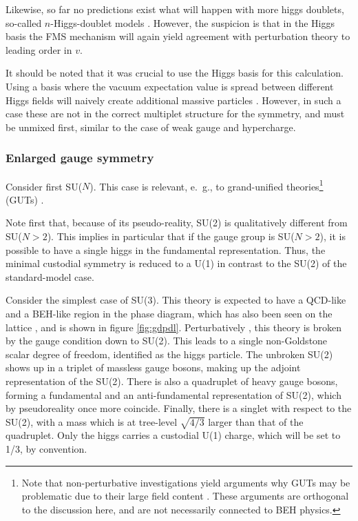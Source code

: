 \documentclass[final,twoside,12pt]{article}
\newcommand*{\1}{1\!\!\!\bot}
\begin{document}
Likewise, so far no predictions exist what will happen with more higgs doublets, so-called $n$-Higgs-doublet models \cite{Ivanov:2017dad}. However, the suspicion is that in the Higgs basis the FMS mechanism will again yield agreement with perturbation theory to leading order in $v$.

It should be noted that it was crucial to use the Higgs basis for this calculation. Using a basis where the vacuum expectation value is spread between different Higgs fields will naively create additional massive particles \cite{Maas:2015gma}. However, in such a case these are not in the correct multiplet structure for the symmetry, and must be unmixed first, similar to the case of weak gauge and hypercharge.

\subsubsection{Enlarged gauge symmetry}\label{sss:gut}

Consider first SU($N$). This case is relevant, e.\ g., to grand-unified theories\footnote{Note that non-perturbative investigations yield arguments why GUTs may be problematic due to their large field content \cite{Llanes-Estrada:2017zws,Shaposhnikov:2009pv,Dona:2013qba,Eichhorn:2016esv,Litim:2011qf}. These arguments are orthogonal to the discussion here, and are not necessarily connected to BEH physics.} (GUTs) \cite{Bohm:2001yx,Langacker:1980js}.

Note first that, because of its pseudo-reality, SU(2) is qualitatively different from SU($N>2$). This implies in particular that if the gauge group is SU($N>2$), it is possible to have a single higgs in the fundamental representation. Thus, the minimal custodial symmetry is reduced to a U(1) in contrast to the SU(2) of the standard-model case.

Consider the simplest case of SU(3). This theory is expected to have a QCD-like and a BEH-like region in the phase diagram, which has also been seen on the lattice \cite{Maas:2016ngo}, and is shown in figure \ref{fig:gdpdl}. Perturbatively \cite{Bohm:2001yx,Maas:2016ngo}, this theory is broken by the gauge condition down to SU(2). This leads to a single non-Goldstone scalar degree of freedom, identified as the higgs particle. The unbroken SU(2) shows up in a triplet of massless gauge bosons, making up the adjoint representation of the SU(2). There is also a quadruplet of heavy gauge bosons, forming a fundamental and an anti-fundamental representation of SU(2), which by pseudoreality once more coincide. Finally, there is a singlet with respect to the SU(2), with a mass which is at tree-level $\sqrt{4/3}$ larger than that of the quadruplet. Only the higgs carries a custodial U(1) charge, which will be set to 1/3, by convention.
\end{document}
